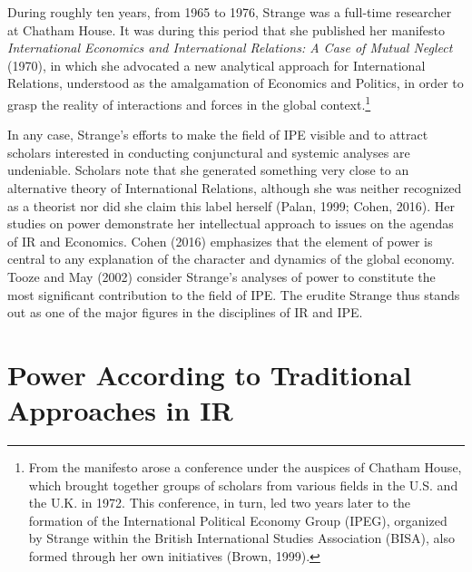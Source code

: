 During roughly ten years, from 1965 to 1976, Strange was a full-time researcher at Chatham House. It was during this period that she published her manifesto \textit{International Economics and International Relations: A Case of Mutual Neglect} (1970), in which she advocated a new analytical approach for International Relations, understood as the amalgamation of Economics and Politics, in order to grasp the reality of interactions and forces in the global context.\footnote{From the manifesto arose a conference under the auspices of Chatham House, which brought together groups of scholars from various fields in the U.S. and the U.K. in 1972. This conference, in turn, led two years later to the formation of the International Political Economy Group (IPEG), organized by Strange within the British International Studies Association (BISA), also formed through her own initiatives (Brown, 1999).}

In any case, Strange’s efforts to make the field of IPE visible and to attract scholars interested in conducting conjunctural and systemic analyses are undeniable. Scholars note that she generated something very close to an alternative theory of International Relations, although she was neither recognized as a theorist nor did she claim this label herself (Palan, 1999; Cohen, 2016). Her studies on power demonstrate her intellectual approach to issues on the agendas of IR and Economics. Cohen (2016) emphasizes that the element of power is central to any explanation of the character and dynamics of the global economy. Tooze and May (2002) consider Strange’s analyses of power to constitute the most significant contribution to the field of IPE. The erudite Strange thus stands out as one of the major figures in the disciplines of IR and IPE.

\section{Power According to Traditional Approaches in IR}


